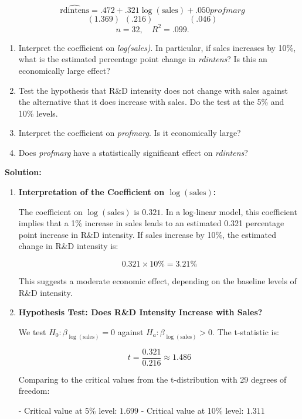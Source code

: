 \documentclass[12pt]{article}
\begin{document}
\begin{enumerate}
\[
\widehat{\text{rdintens}} = .472 + .321 \log(\text{sales}) + .050 \textit{profmarg}
\]
\[
(1.369)\,\,\, (.216) \quad\quad\quad\quad\,\, (.046)
\]
\[
n = 32,\quad R^2 = .099.
\]

\begin{enumerate}
    \item Interpret the coefficient on \textit{log(sales)}. In particular, if sales increases by 10\%, what is the estimated percentage point change in \textit{rdintens}? Is this an economically large effect?
    \item Test the hypothesis that R\&D intensity does not change with sales against the alternative that it does increase with sales. Do the test at the 5\% and 10\% levels.
    \item Interpret the coefficient on \textit{profmarg}. Is it economically large?
    \item Does \textit{profmarg} have a statistically significant effect on \textit{rdintens}?
\end{enumerate}

{\color{blue}
\noindent \textbf{Solution:}

\begin{enumerate}
    \item \textbf{Interpretation of the Coefficient on \(\log(\text{sales})\):}
    
    The coefficient on \(\log(\text{sales})\) is \( 0.321 \). In a log-linear model, this coefficient implies that a 1\% increase in sales leads to an estimated 0.321 percentage point increase in R\&D intensity. If sales increase by 10\%, the estimated change in R\&D intensity is:
    
    \[
    0.321 \times 10\% = 3.21\%
    \]
    
    This suggests a moderate economic effect, depending on the baseline levels of R\&D intensity.
    
    \item \textbf{Hypothesis Test: Does R\&D Intensity Increase with Sales?}
    
    We test \( H_0: \beta_{\log(\text{sales})} = 0 \) against \( H_a: \beta_{\log(\text{sales})} > 0 \). The t-statistic is:
    
    \[
    t = \frac{0.321}{0.216} \approx 1.486
    \]
    
    Comparing to the critical values from the t-distribution with 29 degrees of freedom:
    
    - Critical value at 5\% level: \( 1.699 \)
    - Critical value at 10\% level: \( 1.311 \)
    

\end{enumerate}}
\end{enumerate}
\end{document}
